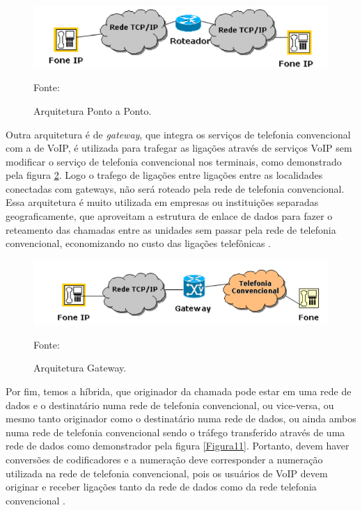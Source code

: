 \begin{figure}[h]
	\centering
	\includegraphics[width=16.0cm]{imagens/pontoaponto.jpg}
	\caption{Arquitetura Ponto a Ponto.}
    \label{Figura9}
    Fonte: \cite{eduardomaronasmonks2006}
\end{figure}

Outra arquitetura é de \textit{gateway}, que integra os serviços de telefonia convencional com a de VoIP, é utilizada para trafegar as ligações através de serviços VoIP sem modificar o serviço de telefonia convencional nos terminais, como demonstrado pela figura \ref{Figura10}. Logo o trafego de ligações entre ligações entre as localidades conectadas com gateways, não será roteado pela rede de telefonia convencional. Essa arquitetura é muito utilizada em empresas ou instituições separadas geograficamente, que aproveitam a estrutura de enlace de dados para fazer o reteamento das chamadas entre as unidades sem passar pela rede de telefonia convencional, economizando no custo das ligações telefônicas \cite{eduardomaronasmonks2006}.

\begin{figure}[h]
	\centering
	\includegraphics[width=16.0cm]{imagens/gateway.jpg}
	\caption{Arquitetura Gateway.}
    \label{Figura10}
    Fonte: \cite{eduardomaronasmonks2006}
\end{figure}

Por fim, temos a híbrida, que originador da chamada pode estar em uma rede de dados e o destinatário numa rede de telefonia convencional, ou vice-versa, ou mesmo tanto originador como o destinatário numa rede de dados, ou ainda ambos numa rede de telefonia convencional sendo o tráfego transferido através de uma rede de dados como demonstrador pela figura \ref{Figura11}. Portanto, devem haver conversões de codificadores e a numeração deve corresponder a numeração utilizada na rede de telefonia convencional, pois os usuários de VoIP devem originar e receber ligações tanto da rede de dados como da rede telefonia convencional \cite{eduardomaronasmonks2006}.

